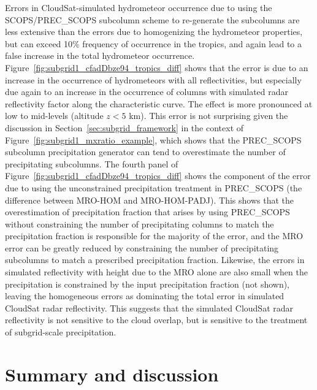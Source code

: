 Errors in CloudSat-simulated hydrometeor occurrence due to using the
SCOPS/PREC\_SCOPS subcolumn scheme to re-generate the subcolumns are
less extensive than the errors due to homogenizing the hydrometeor
properties, but can exceed 10\% frequency of occurrence in the tropics,
and again lead to a false increase in the total hydrometeor occurrence.
Figure~\ref{fig:subgrid1_cfadDbze94_tropics_diff} shows that the error
is due to an increase in the occurrence of hydrometeors with all
reflectivities, but especially due again to an increase in the
occurrence of columns with simulated radar reflectivity factor along the
characteristic curve. The effect is more pronounced at low to mid-levels
(altitude \(z < 5\) km). This error is not surprising given the
discussion in Section~\ref{sec:subgrid_framework} in the context of
Figure~\ref{fig:subgrid1_mxratio_example}, which shows that the
PREC\_SCOPS subcolumn precipitation generator can tend to overestimate
the number of precipitating subcolumns. The fourth panel of
Figure~\ref{fig:subgrid1_cfadDbze94_tropics_diff} shows the component of
the error due to using the unconstrained precipitation treatment in
PREC\_SCOPS (the difference between MRO-HOM and MRO-HOM-PADJ). This
shows that the overestimation of precipitation fraction that arises by
using PREC\_SCOPS without constraining the number of precipitating
columns to match the precipitation fraction is responsible for the
majority of the error, and the MRO error can be greatly reduced by
constraining the number of precipitating subcolumns to match a
prescribed precipitation fraction. Likewise, the errors in simulated
reflectivity with height due to the MRO alone are also small when the
precipitation is constrained by the input precipitation fraction (not
shown), leaving the homogeneous errors as dominating the total error in
simulated CloudSat radar reflectivity. This suggests that the simulated
CloudSat radar reflectivity is not sensitive to the cloud overlap, but
is sensitive to the treatment of subgrid-scale precipitation.

\section{Summary and discussion}\label{sec:summary-and-discussion}

